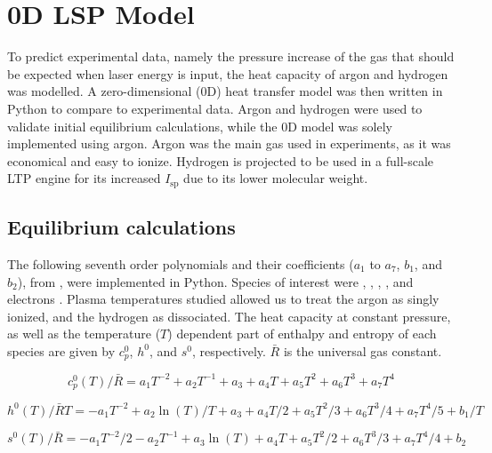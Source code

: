 \chapter{0D LSP Model} \label{chp:models}

    To predict experimental data, namely the pressure increase of the gas that should be expected when laser energy is input, the heat capacity of argon and hydrogen was modelled. A zero-dimensional (0D) heat transfer model was then written in Python to compare to experimental data. Argon and hydrogen were used to validate initial equilibrium calculations, while the 0D model was solely implemented using argon. Argon was the main gas used in experiments, as it was economical and easy to ionize. Hydrogen is projected to be used in a full-scale LTP engine for its increased $I_\mathrm{sp}$ due to its lower molecular weight.

    \section{Equilibrium calculations} \label{sec:equilibrium calcs}
        
        The following seventh order polynomials and their coefficients ($a_1$ to $a_7$, $b_1$, and $b_2$), from \textcite{mcbrideNASAGlennCoefficients2002}, were implemented in Python. Species of interest were , , , , and electrons . Plasma temperatures studied allowed us to treat the argon as singly ionized, and the hydrogen as dissociated. The heat capacity at constant pressure, as well as the temperature ($T$) dependent part of enthalpy and entropy of each species are given by $c_p^0$, $h^0$, and $s^0$, respectively. $\bar R$ is the universal gas constant.

        \begin{equation}
            c_p^0 (T)/\bar R = a_1 T^{-2} + a_2 T^{-1} + a_3 + a_4   T + a_5 T^2 + a_6 T^3 + a_7 T^4
        \end{equation} 
        
        \begin{equation}
            h^0 (T)/\bar RT = -a_1 T^{-2} + a_2 \ln(T)/T + a_3 + a_4 T / 2 + a_5 {T^2}/3 + a_6 {T^3}/4 + a_7 {T^4}/5 + b_1/T
        \end{equation}
        
        \begin{equation}
            s^0(T)/\bar R = -a_1 T^{-2}/2 - a_2 T^{-1} + a_3\ln(T) + a_4   T + a_5 {T^2}/2 + a_6 T^3/3 + a_7 T^4/4 + b_2
        \end{equation}

